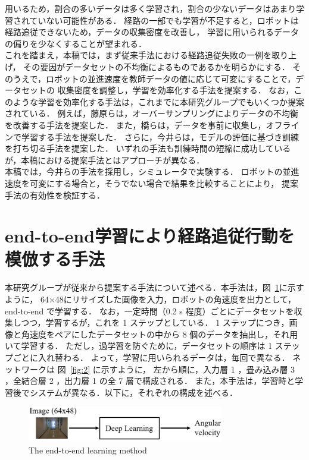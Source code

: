 \documentclass{jarticle}
\renewcommand{\figurename}{図~}
\newcommand{\figref}[1]{\figurename\ref{#1}}
\begin{document}
用いるため，割合の多いデータは多く学習され，割合の少ないデータはあまり学習されていない可能性がある．
経路の一部でも学習が不足すると，ロボットは経路追従できないため，データの収集密度を改善し，
学習に用いられるデータの偏りを少なくすることが望まれる．\\
\hspace*{1zw}これを踏まえ，本稿では，まず従来手法における経路追従失敗の一例を取り上げ，
その要因がデータセットの不均衡によるものであるかを明らかにする．
そのうえで，ロボットの並進速度を教師データの値に応じて可変にすることで，データセットの
収集密度を調整し，学習を効率化する手法を提案する．
なお，このような学習を効率化する手法は，これまでに本研究グループでもいくつか提案されている．
例えば，藤原らは，オーバーサンプリングによりデータの不均衡を改善する手法を提案した\cite{fuji}．
また，橋らは，データを事前に収集し，オフラインで学習する手法を提案した\cite{takahashi}．
さらに，今井らは，モデルの評価に基づき訓練を打ち切る手法を提案した\cite{imai2}．
いずれの手法も訓練時間の短縮に成功しているが，本稿における提案手法とはアプローチが異なる．\\
\hspace*{1zw}本稿では，今井らの手法を採用し，シミュレータで実験する．
ロボットの並進速度を可変にする場合と，そうでない場合で結果を比較することにより，
提案手法の有効性を検証する．


\section{end-to-end学習により経路追従行動を模倣する手法}
本研究グループが従来から提案する手法について述べる．本手法は，\figref{fig:1}に示すように，
64×48にリサイズした画像を入力，ロボットの角速度を出力として， end-to-end で学習する．
なお，一定時間（0.2 s 程度）ごとにデータセットを収集しつつ，学習するが，これを 1 ステップとしている．
1 ステップにつき，画像と角速度をペアにしたデータセットの中から 8 個のデータを抽出し，それ用いて学習する．
ただし，過学習を防ぐために，データセットの順序は 1 ステップごとに入れ替わる．
よって，学習に用いられるデータは，毎回で異なる．
ネットワークは \figref{fig:2} に示すように，
左から順に，入力層 1 ，畳み込み層 3 ，全結合層 2 ，出力層 1 の全 7 層で構成される．
また，本手法は，学習時と学習後でシステムが異なる．以下に，それぞれの構成を述べる．


\begin{figure}[h!]
  \centering
   \includegraphics[height=15.5mm]{./pdf/deplearning1.pdf}
   \caption{The end-to-end learning method}
   \label{fig:1}
\end{figure}
\end{document}
